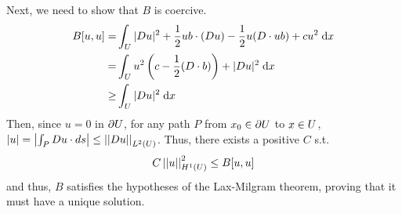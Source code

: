 Next, we need to show that $B$ is coercive.
\begin{align*}
  B[u, u] = &\int_{U} |D u|^2 + \frac{1}{2} u b \cdot (D u)
             - \frac{1}{2} u (D \cdot u b) + c u^2 \;\mathrm{d}x\\
          = &\int_{U} u^2 \left(c - \frac{1}{2} (D \cdot b) \right)
                          + |D u|^2 \;\mathrm{d}x\\
       \geq &\int_{U} |D u|^2 \;\mathrm{d}x
\end{align*}
Then, since $u = 0$ in $\partial U$,
for any path $P$ from $x_0 \in \partial U$ to $x \in U$,
$|u| = \left|\int_{P} D u \cdot ds \right| \leq \left|\left|D u\right|\right|_{L^{2}(U)}$.
Thus, there exists a positive $C$ s.t.
\begin{align*}
  C \left|\left|u\right|\right|_{H^{1}(U)}^2 \leq B[u, u]
\end{align*}
and thus, $B$ satisfies the hypotheses of the Lax-Milgram theorem,
proving that it must have a unique solution.\\

